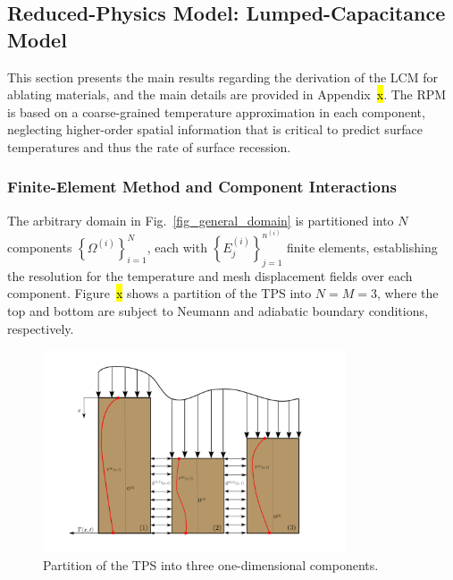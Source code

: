 \subsection{Reduced-Physics Model: Lumped-Capacitance Model}

This section presents the main results regarding the derivation of the LCM for ablating materials, and the main details are provided in Appendix~\hl{x}. The RPM is based on a coarse-grained temperature approximation in each component, neglecting higher-order spatial information that is critical to predict surface temperatures and thus the rate of surface recession. 

\subsubsection{Finite-Element Method and Component Interactions}

The arbitrary domain in Fig.~\ref{fig_general_domain} is partitioned into $N$ components $\left\{\Omega^{(i)}\right\}_{i=1}^{N}$, each with $\left\{E^{(i)}_j\right\}_{j=1}^{n^{(i)}}$ finite elements, establishing the resolution for the temperature and mesh displacement fields over each component. Figure~\hl{x} shows a partition of the TPS into $N=M=3$, where the top and bottom are subject to Neumann and adiabatic boundary conditions, respectively. 

\begin{figure}
    \centering
    \includegraphics[width=0.8\textwidth]{./figs/three_components.png}
    \caption{Partition of the TPS into three one-dimensional components.}
    \label{fig_domain_partition}
\end{figure}

